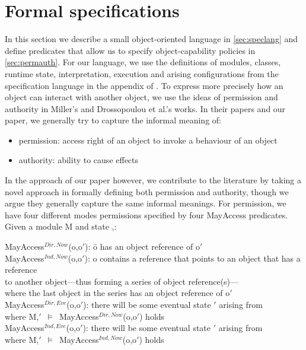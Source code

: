 \documentclass[a4paper,11pt,twoside]{article}
\newcommand{\losigma}{\text{$\upsigma$}}
\newcommand{\loturns} {$\vDash$}
\begin{document}
\section{Formal specifications}\label{sec:specs}
In this section we describe a small object-oriented language in \cref{sec:speclang} and define predicates that allow us to specify object-capability policies in \cref{sec:permauth}. For our language, we use the definitions of modules, classes, runtime state, interpretation, execution and arising configurations from the specification language in the appendix of \cite{drossopoulou2015b}. To express more precisely how an object can interact with another object, we use the ideas of permission and authority in Miller's\cite{miller2006} and Drossopoulou et al.'s\cite{drossopoulou2016} works. In their papers and our paper, we generally try to capture the informal meaning of:
\begin{itemize}
\item permission: access right of an object to invoke a behaviour of an object
\item authority: ability to cause effects
\end{itemize}
In the approach of our paper however, we contribute to the literature by taking a novel approach in formally defining both permission and authority, though we argue they generally capture the same informal meanings. For permission, we have four different modes permissions specified by four MayAccess predicates. Given a module M and state \losigma,:
\begin{tabbing}
MayAccess$^{Dir,Now}$(o,o$'$): \=o has an object reference of o$'$\\
MayAccess$^{Ind,Now}$(o,o$'$): o contains a reference that points to an object that has a reference\\
\>to another object---thus forming a series of object reference(s)---\\ \> where the last object in the series has an object reference of o$'$\\
MayAccess$^{Dir,Eve}$(o,o$'$): there will be some eventual state \losigma$'$ arising from \losigma\,\\ \> where M,\losigma$'$\ \loturns\ MayAccess$^{Dir,Now}$(o,o$'$) holds\\
MayAccess$^{Ind,Eve}$(o,o$'$): there will be some eventual state \losigma$'$ arising from \losigma\,\\ \> where M,\losigma$'$\ \loturns\ MayAccess$^{Ind,Now}$(o,o$'$) holds\\
\end{tabbing}
\end{document}
